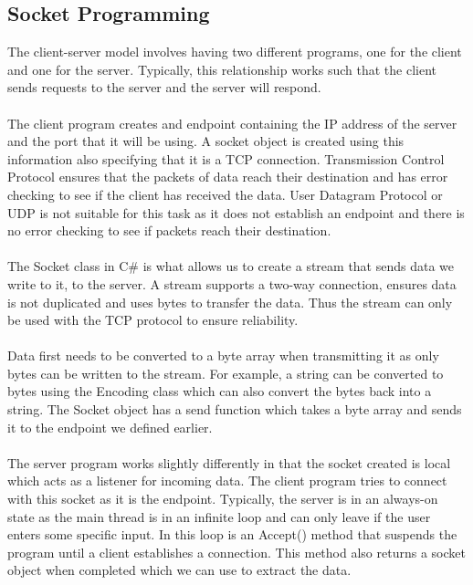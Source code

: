 \documentclass[a4paper]{report}
\begin{document}
\subsection{Socket Programming}
The client-server model involves having two different programs, one for the client and one for the server. Typically, this relationship works such that the client sends requests to the server and the server will respond.
\\\\
The client program creates and endpoint containing the IP address of the server and the port that it will be using. A socket object is created using this information also specifying that it is a TCP connection. Transmission Control Protocol ensures that the packets of data reach their destination and has error checking to see if the client has received the data. User Datagram Protocol or UDP is not suitable for this task as it does not establish an endpoint and there is no error checking to see if packets reach their destination. \cite{TCP}
\\\\
The Socket class in C\# is what allows us to create a stream that sends data we write to it, to the server. A stream supports a two-way connection, ensures data is not duplicated and uses bytes to transfer the data. Thus the stream can only be used with the TCP protocol to ensure reliability. \cite{Server}
\pagebreak
\\\\
Data first needs to be converted to a byte array when transmitting it as only bytes can be written to the stream. For example, a string can be converted to bytes using the Encoding class which can also convert the bytes back into a string. The Socket object has a send function which takes a byte array and sends it to the endpoint we defined earlier. \cite{Server}
\\\\
The server program works slightly differently in that the socket created is local which acts as a listener for incoming data.  The client program tries to connect with this socket as it is the endpoint. Typically, the server is in an always-on state as the main thread is in an infinite loop and can only leave if the user enters some specific input. In this loop is an Accept() method that suspends the program until a client establishes a connection. This method also returns a socket object when completed which we can use to extract the data. 
\\\\
\end{document}
